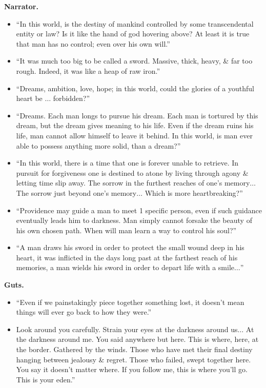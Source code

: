 \documentclass[oneside]{book}
\numberwithin{equation}{section}
\begin{document}
\begin{enumerate}
    \textbf{Narrator.}
   	\begin{itemize}
   		\item ``In this world, is the destiny of mankind controlled by some transcendental entity or law? Is it like the hand of god hovering above? At least it is true that man has no control; even over his own will.''
   		\item ``It was much too big to be called a sword. Massive, thick, heavy, \& far too rough. Indeed, it was like a heap of raw iron.''
   		\item ``Dreams, ambition, love, hope; in this world, could the glories of a youthful heart be $\ldots$ forbidden?''
   		\item ``Dreams. Each man longs to pursue his dream. Each man is tortured by this dream, but the dream gives meaning to his life. Even if the dream ruins his life, man cannot allow himself to leave it behind. In this world, is man ever able to possess anything more solid, than a dream?''
   		\item ``In this world, there is a time that one is forever unable to retrieve. In pursuit for forgiveness one is destined to atone by living through agony \& letting time slip away. The sorrow in the furthest reaches of one's memory$\ldots$ The sorrow just beyond one's memory$\ldots$ Which is more heartbreaking?''
   		\item ``Providence may guide a man to meet 1 specific person, even if such guidance eventually leads him to darkness. Man simply cannot forsake the beauty of his own chosen path. When will man learn a way to control his soul?''
   		\item ``A man draws his sword in order to protect the small wound deep in his heart, it was inflicted in the days long past at the farthest reach of his memories, a man wields his sword in order to depart life with a smile$\ldots$''
   	\end{itemize}
    \textbf{Guts.}
    \begin{itemize}
    	\item ``Even if we painstakingly piece together something lost, it doesn't mean things will ever go back to how they were.''
    	\item Look around you carefully. Strain your eyes at the darkness around us$\ldots$ At the darkness around me. You said anywhere but here. This is where, here, at the border. Gathered by the winds. Those who have met their final destiny hanging between jealousy \& regret. Those who failed, swept together here. You say it doesn't matter where. If you follow me, this is where you'll go. This is your eden.''

\end{itemize}
\end{enumerate}
\end{document}
